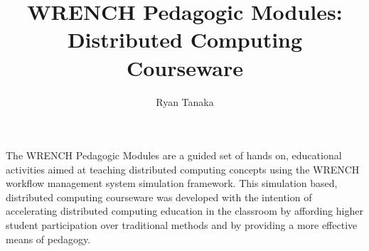 \documentclass{article}
\begin{document}
\title{WRENCH Pedagogic Modules: Distributed Computing Courseware}
\author{Ryan Tanaka}

The WRENCH Pedagogic Modules are a guided set of hands on, educational
activities aimed at teaching distributed computing concepts using the
WRENCH workflow management system simulation framework. This simulation
based, distributed computing courseware was developed with the intention
of accelerating distributed computing education in the classroom by affording
higher student participation over traditional methods and by providing a
more effective means of pedagogy. 
\end{document}
